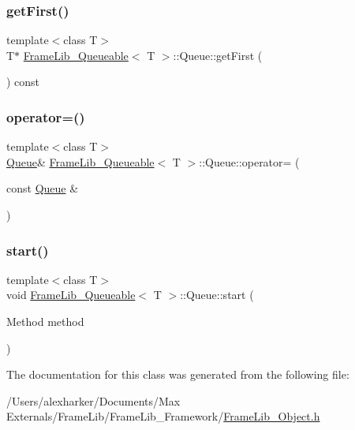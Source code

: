 \subsubsection{\texorpdfstring{get\+First()}{getFirst()}}
{\footnotesize\ttfamily template$<$class T$>$ \\
T$\ast$ \hyperlink{class_frame_lib___queueable}{Frame\+Lib\+\_\+\+Queueable}$<$ T $>$\+::Queue\+::get\+First (\begin{DoxyParamCaption}{ }\end{DoxyParamCaption}) const\hspace{0.3cm}{\ttfamily [inline]}}

\mbox{\label{class_frame_lib___queueable_1_1_queue_ad4185ad6feb21ba3cdc449274fc089db}} 
\subsubsection{\texorpdfstring{operator=()}{operator=()}}
{\footnotesize\ttfamily template$<$class T$>$ \\
\hyperlink{class_frame_lib___queueable_1_1_queue}{Queue}\& \hyperlink{class_frame_lib___queueable}{Frame\+Lib\+\_\+\+Queueable}$<$ T $>$\+::Queue\+::operator= (\begin{DoxyParamCaption}\item[{const \hyperlink{class_frame_lib___queueable_1_1_queue}{Queue} \&}]{ }\end{DoxyParamCaption})\hspace{0.3cm}{\ttfamily [delete]}}

\mbox{\label{class_frame_lib___queueable_1_1_queue_a3fb4a73a39929ac3defbb98e3efdd363}} 
\subsubsection{\texorpdfstring{start()}{start()}}
{\footnotesize\ttfamily template$<$class T$>$ \\
void \hyperlink{class_frame_lib___queueable}{Frame\+Lib\+\_\+\+Queueable}$<$ T $>$\+::Queue\+::start (\begin{DoxyParamCaption}\item[{Method}]{method }\end{DoxyParamCaption})\hspace{0.3cm}{\ttfamily [inline]}}



The documentation for this class was generated from the following file\+:\begin{DoxyCompactItemize}
\item 
/\+Users/alexharker/\+Documents/\+Max Externals/\+Frame\+Lib/\+Frame\+Lib\+\_\+\+Framework/\hyperlink{_frame_lib___object_8h}{Frame\+Lib\+\_\+\+Object.\+h}\end{DoxyCompactItemize}
